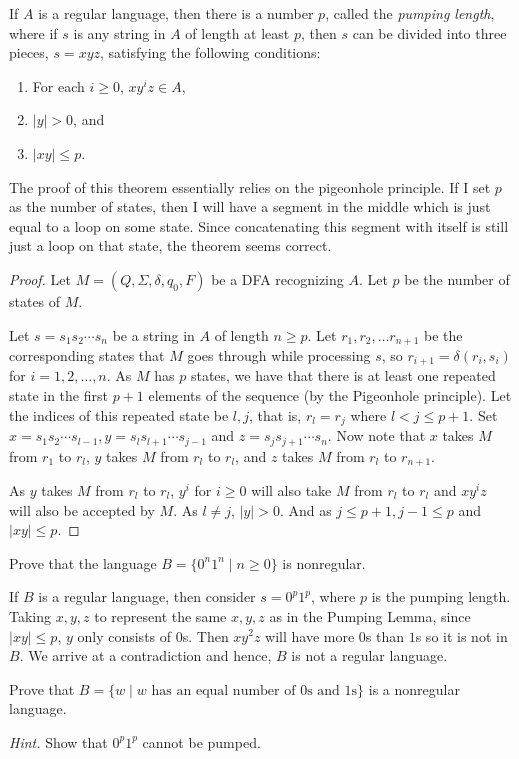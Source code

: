 \begin{theorem}
If $A$ is a regular language, then there is a number $p$, called the \textit{pumping length}, where if $s$ is any string in $A$ of length at least $p$, then $s$ can be divided into three pieces, $s=xyz$, satisfying the following conditions:
\begin{enumerate}
	\item For each $i\geq 0$, $xy^iz\in A$,
	\item $|y|>0$, and
	\item $|xy|\leq p$.
\end{enumerate}
\end{theorem}

The proof of this theorem essentially relies on the pigeonhole principle. If I set $p$ as the number of states, then I will have a segment in the middle which is just equal to a loop on some state. Since concatenating this segment with itself is still just a loop on that state, the theorem seems correct.

\begin{proof}
Let $M=(Q,\Sigma,\delta,q_0,F)$ be a DFA recognizing $A$. Let $p$ be the number of states of $M$.

Let $s=s_1s_2\cdots s_n$ be a string in $A$ of length $n\geq p$. Let $r_1,r_2,\ldots r_{n+1}$ be the corresponding states that $M$ goes through while processing $s$, so $r_{i+1}=\delta(r_i,s_i)$ for $i=1,2,\ldots,n$. As $M$ has $p$ states, we have that there is at least one repeated state in the first $p+1$ elements of the sequence (by the Pigeonhole principle). Let the indices of this repeated state be $l,j$, that is, $r_l=r_j$ where $l< j\leq p+1$. Set $x=s_1s_2\cdots s_{l-1}, y=s_ls_{l+1}\cdots s_{j-1}$ and $z=s_js_{j+1}\cdots s_n$. Now note that $x$ takes $M$ from $r_1$ to $r_l$, $y$ takes $M$ from $r_l$ to $r_l$, and $z$ takes $M$ from $r_l$ to $r_{n+1}$.

As $y$ takes $M$ from $r_l$ to $r_l$, $y^i$ for $i\geq 0$ will also take $M$ from $r_l$ to $r_l$ and $xy^iz$ will also be accepted by $M$. As $l\neq j$, $|y|>0$. And as $j\leq p+1, j-1\leq p$ and $|xy|\leq p$.
\end{proof}

\begin{exercise}
Prove that the language $B=\{0^n1^n\mid n\geq 0\}$ is nonregular.
\end{exercise}
\begin{solution}
If $B$ is a regular language, then consider $s=0^p1^p$, where $p$ is the pumping length. Taking $x,y,z$ to represent the same $x,y,z$ as in the Pumping Lemma, since $|xy|\leq p$, $y$ only consists of $0$s. Then $xy^2z$ will have more $0$s than $1$s so it is not in $B$.
We arrive at a contradiction and hence, $B$ is not a regular language.
\end{solution}
\begin{exercise}
Prove that $B=\{w\mid w\text{ has an equal number of $0$s and $1$s}\}$ is a nonregular language.
\end{exercise}
\textit{Hint. }Show that $0^p1^p$ cannot be pumped.

